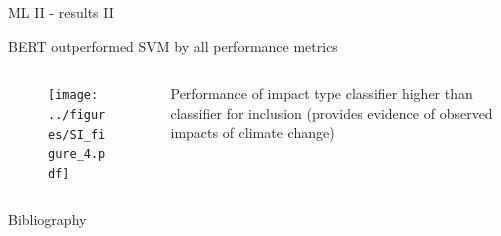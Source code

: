 \documentclass[9pt]{beamer}
\begin{document}
\begin{frame}{ML II - results II}

BERT outperformed SVM by all performance metrics

\begin{columns}
\begin{column}{0.618\linewidth}
\begin{figure}
\texttt{[image: ../figures/SI\_figure\_4.pdf]}
\end{figure}
\end{column}

\begin{column}{0.382\linewidth}
Performance of impact type classifier higher than classifier for inclusion (provides evidence of observed impacts of climate change)
\end{column}
\end{columns}



\end{frame}

\begin{frame}{Bibliography}

\end{frame}
\end{document}
